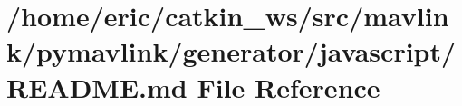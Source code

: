 \hypertarget{mavlink_2pymavlink_2generator_2javascript_2README_8md}{}\section{/home/eric/catkin\+\_\+ws/src/mavlink/pymavlink/generator/javascript/\+R\+E\+A\+D\+ME.md File Reference}
\label{mavlink_2pymavlink_2generator_2javascript_2README_8md}
